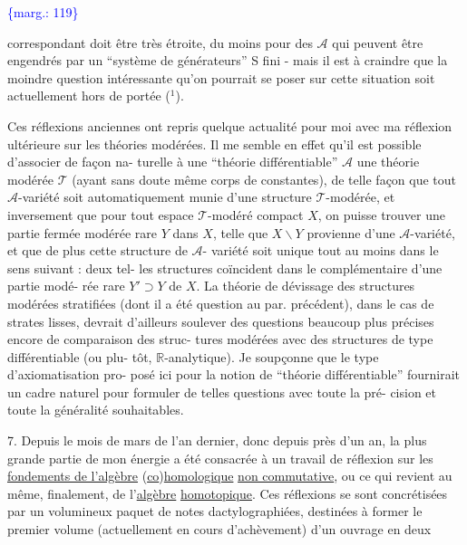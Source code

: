 \documentclass[11pt]{article}
\newcommand{\scanpage}[1]{\par\bigskip\noindent{\small\sffamily[scan #1]}\par}
\newcommand{\mspage}[1]{{\small\sffamily[p.\,#1]}}
\newcommand{\margin}[1]{\textcolor{blue}{\{\textsf{marg.:} #1\}}}
\newcommand{\uline}[1]{\underline{#1}}
\begin{document}
\margin{119}

\clearpage
\scanpage{119/120}
\mspage{42}

correspondant doit être très étroite, du moins pour des $\mathcal{A}$ qui
peuvent être engendrés par un ``système de générateurs'' S fini -
mais il est à craindre que la moindre question intéressante qu'on
pourrait se poser sur cette situation soit actuellement hors de
portée ($^1$).

Ces réflexions anciennes ont repris quelque actualité
pour moi avec ma réflexion ultérieure sur les théories modérées.
Il me semble en effet qu'il est possible d'associer de façon na-%
turelle à une ``théorie différentiable'' $\mathcal{A}$ une théorie modérée $\mathcal{T}$
(ayant sans doute même corps de constantes), de telle façon que
tout $\mathcal{A}$-variété soit automatiquement munie d'une structure $\mathcal{T}$-modérée,
et inversement que pour tout espace $\mathcal{T}$-modéré compact $X$, on puisse
trouver une partie fermée modérée rare $Y$ dans $X$, telle que $X \smallsetminus Y$
provienne d'une $\mathcal{A}$-variété, et que de plus cette structure de $\mathcal{A}$-%
variété soit unique tout au moins dans le sens suivant : deux tel-%
les structures coïncident dans le complémentaire d'une partie modé-%
rée rare $Y' \supset Y$ de $X$. La théorie de dévissage des structures
modérées stratifiées (dont il a été question au par. précédent),
dans le cas de strates lisses, devrait d'ailleurs soulever des
questions beaucoup plus précises encore de comparaison des struc-%
tures modérées avec des structures de type différentiable (ou plu-%
tôt, $\mathbb{R}$-analytique). Je soupçonne que le type d'axiomatisation pro-%
posé ici pour la notion de ``théorie différentiable'' fournirait un
cadre naturel pour formuler de telles questions avec toute la pré-%
cision et toute la généralité souhaitables.


7. Depuis le mois de mars de l'an dernier, donc depuis près
d'un an, la plus grande partie de mon énergie a été consacrée à un
travail de réflexion sur les \uline{fondements de l'algèbre} (\uline{co})\uline{homologique}
\uline{non commutative}, ou ce qui revient au même, finalement, de l'\uline{algèbre}
\uline{homotopique}. Ces réflexions se sont concrétisées par un volumineux
paquet de notes dactylographiées, destinées à former le premier
volume (actuellement en cours d'achèvement) d'un ouvrage en deux
\end{document}
